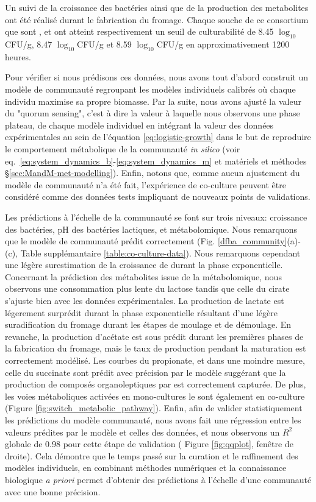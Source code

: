 \documentclass[../main.tex]{subfiles}
\begin{document}
Un suivi de la croissance des bactéries ainsi que de la production des metabolites ont été réalisé durant le fabrication du fromage. Chaque souche de ce consortium que sont \lactis, \plantarum et \freud ont atteint respectivement un seuil de culturabilité de 8.45 $\log_{10}$CFU/g, 8.47 $\log_{10}$CFU/g et 8.59 $\log_{10}$CFU/g en approximativement 1200 heures.

Pour vérifier si nous prédisons ces données, nous avons tout d'abord construit un modèle de communauté regroupant les modèles individuels calibrés où chaque individu maximise sa propre biomasse. Par la suite, nous avons ajusté la valeur du "quorum sensing", c'est à dire la valeur à laquelle nous observons une phase plateau, de chaque modèle individuel en intégrant la valeur des données expérimentales au sein de l'équation \ref{eq:logistic-growth} dans le but de reproduire le comportement métabolique de la communauté \textit{in silico} (voir eq.~\eqref{eq:system_dynamics_b}-\eqref{eq:system_dynamics_m} et matériels et méthodes \S\ref{sec:MandM-met-modelling}). Enfin, notons que, comme aucun ajustement du modèle de communauté n'a été fait, l'expérience de co-culture peuvent être considéré comme des données tests impliquant de nouveaux points de validations. 

Les prédictions à l'échelle de la communauté se font sur trois niveaux: croissance des bactéries, pH des bactéries lactiques, et métabolomique. Nous remarquons que le modèle de communauté prédit correctement  (Fig. \ref{dfba_community}(a)-(c), Table supplémantaire \ref{table:co-culture-data}). Nous remarquons cependant une légère surestimation de la croissance de \freud durant la phase exponentielle. Concernant la prédiction des métabolites issue de la métabolomique, nous observons une consommation plus lente du lactose tandis que celle du cirate s'ajuste bien avec les données expérimentales. La production de lactate est légerement surprédit durant la phase exponentielle résultant d'une légère suradification du fromage durant les étapes de moulage et de démoulage. En revanche, la production d'acétate est sous prédit durant les premières phases de la fabrication du fromage, mais le taux de production pendant la maturation est correctement modélisé. Les courbes du propionate, et dans une moindre mesure, celle du succinate sont prédit avec précision par le modèle suggérant que la production de composés organoleptiques par \freud est correctement capturée. De plus, les voies métaboliques activées en mono-cultures le sont également en co-culture (Figure \ref{fig:switch_metabolic_pathway}). Enfin, afin de valider statistiquement les prédictions du modèle communauté, nous avons fait une régression entre les valeurs prédites par le modèle et celles des données, et nous observons un $R^2$ globale de 0.98 pour cette étape de validation ( Figure \ref{fig:qqplot}, fenêtre de droite). Cela démontre que le temps passé sur la curation et le raffinement des modèles individuels, en combinant méthodes numériques et la connaissance biologique \textit{a priori} permet d'obtenir des prédictions à l'échelle d'une communauté avec une bonne précision. \\
\end{document}
